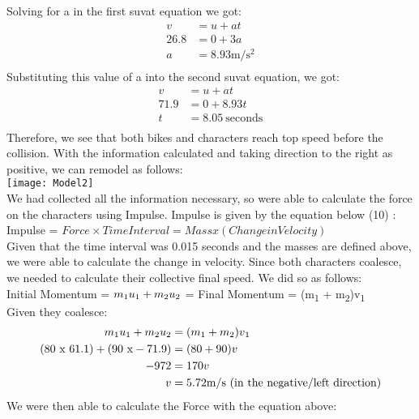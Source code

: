 \documentclass{article}
\begin{document}
Solving for a in the first suvat equation we got:
\begin{align*}
v &= u + at\\
26.8 &=0 + 3a\\
a &=8.93 \text{m/s$^2$}\\
\end{align*}
Substituting this value of a into the second suvat equation, we got:
\begin{align*}
v &= u + at\\
71.9 &=0 + 8.93t\\
t &=8.05 ~\text{seconds}\\
\end{align*} Therefore, we see that both bikes and characters reach top speed before the collision. With the information calculated and taking direction to the right as positive, we can remodel as follows:\\
\texttt{[image: Model2]}\\[5pt]
We had collected all the information necessary, so were able to calculate the force on the characters using Impulse. Impulse is given by the equation below (10) :\\[3pt]

Impulse = $Force\times Time Interval =Mass x (Change in Velocity)$\\[10pt]
Given that the time interval was 0.015 seconds and the masses are defined above, we were able to calculate the change in velocity. Since both characters coalesce, we needed to calculate their collective final speed. We did so as follows:\\[5pt]
Initial Momentum = $m\textsubscript{1}u\textsubscript{1} + m\textsubscript{2}u\textsubscript{2}$ = Final Momentum = (m\textsubscript{1} + m\textsubscript{2})v\textsubscript{1}\\[5pt]
Given they coalesce:
 \begin{align*}
m\textsubscript{1}u\textsubscript{1} + m\textsubscript{2}u\textsubscript{2} &= (m\textsubscript{1} + m\textsubscript{2})v\textsubscript{1}\\
(80 ~\text{x} ~61.1) + (90~ \text{x} -71.9) &= (80 + 90)v\\
-972 &= 170v\\
v &= 5.72 \text{m/s} ~\text{(in the negative/left direction)}\\
\end{align*}
We were then able to calculate the Force with the equation above:\\
\end{document}
